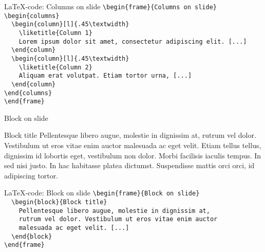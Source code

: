\documentclass[t,11pt]{beamer}
\def\liketitle#1{%
{\usebeamerfont{frametitle}\usebeamercolor[fg]{frametitle}%
\begin{flushleft}%
\vspace{-\baselineskip}%
#1\par
\end{flushleft}%
\vspace{-\baselineskip}%
}%
\vspace{0.75\baselineskip}%
}
\begin{document}
\toggleslidecolors
\begin{frame}[fragile]{\LaTeX-code: Columns on slide}
\footnotesize
\verb|\begin{frame}{Columns on slide}|\\
\verb|\begin{columns}|\\
\verb|  \begin{column}[l]{.45\textwidth}|\\
\verb|    \liketitle{Column 1}|\\
\verb|    Lorem ipsum dolor sit amet, consectetur adipiscing elit. [...]|\\
\verb|  \end{column}|\\
\verb|  \begin{column}[l]{.45\textwidth}|\\
\verb|    \liketitle{Column 2}|\\
\verb|    Aliquam erat volutpat. Etiam tortor urna, [...]|\\
\verb|  \end{column}|\\
\verb|\end{columns}|\\
\verb|\end{frame}|\\
\end{frame}
\toggleslidecolors

\begin{frame}{Block on slide}
\begin{block}{Block title}
Pellentesque libero augue, molestie in dignissim at, rutrum vel dolor. Vestibulum ut eros vitae enim auctor malesuada ac eget velit. Etiam tellus tellus, dignissim id lobortis eget, vestibulum non dolor. Morbi facilisis iaculis tempus. In sed nisi justo. In hac habitasse platea dictumst. Suspendisse mattis orci orci, id adipiscing tortor.
\end{block}
\end{frame}

\toggleslidecolors
\begin{frame}[fragile]{\LaTeX-code: Block on slide}
\footnotesize
\verb|\begin{frame}{Block on slide}|\\
\verb|  \begin{block}{Block title}|\\
\verb|    Pellentesque libero augue, molestie in dignissim at,|\\
\verb|    rutrum vel dolor. Vestibulum ut eros vitae enim auctor|\\
\verb|    malesuada ac eget velit. [...]|\\
\verb|  \end{block}|\\
\verb|\end{frame}|\\
\end{frame}
\toggleslidecolors
\end{document}
